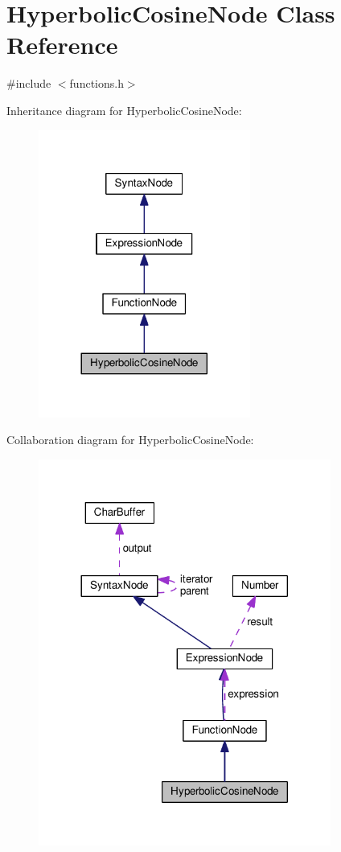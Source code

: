 \hypertarget{classHyperbolicCosineNode}{}\section{Hyperbolic\+Cosine\+Node Class Reference}
\label{classHyperbolicCosineNode}


{\ttfamily \#include $<$functions.\+h$>$}



Inheritance diagram for Hyperbolic\+Cosine\+Node\+:\nopagebreak
\begin{figure}[H]
\begin{center}
\leavevmode
\includegraphics[width=197pt]{classHyperbolicCosineNode__inherit__graph}
\end{center}
\end{figure}


Collaboration diagram for Hyperbolic\+Cosine\+Node\+:\nopagebreak
\begin{figure}[H]
\begin{center}
\leavevmode
\includegraphics[width=272pt]{classHyperbolicCosineNode__coll__graph}
\end{center}
\end{figure}
